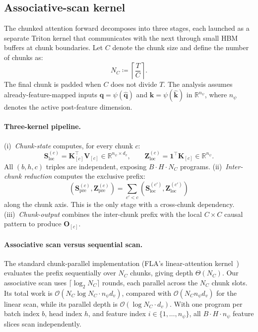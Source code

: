 \documentclass{article}
\newcommand{\1}{\bm{1}}
\newcommand{\defeq}{\coloneqq}
\def\vk{{\bm{k}}}
\def\vq{{\bm{q}}}
\def\mK{{\bm{K}}}
\def\mO{{\bm{O}}}
\def\mS{{\bm{S}}}
\def\mV{{\bm{V}}}
\def\mZ{{\bm{Z}}}
\def\gO{{\mathcal{O}}}
\newcommand{\R}{\mathbb{R}}
\newcommand{\seql}{T}
\theoremstyle{definition}
\begin{document}
\subsection{Associative-scan kernel}
\label{app:tree-scan}

The chunked attention forward decomposes into three stages, each launched as a separate Triton
kernel that communicates with the next through small HBM buffers at chunk boundaries. Let $C$
denote the chunk size and define the number of chunks as:
\[
  N_C\defeq\left\lceil\frac{\seql}{C}\right\rceil.
\]
The final chunk is padded when $C$ does not divide $\seql$. The analysis assumes already-feature-mapped
inputs $\vq=\psi(\hat{\vq})$ and $\vk=\psi(\hat{\vk})$ in $\R^{n_\psi}$, where $n_\psi$ denotes
the active post-feature dimension.

\paragraph{Three-kernel pipeline.} (i)~\emph{Chunk-state} computes, for every chunk $c$:
\[
  \mS^{(c)}_\text{loc}
    =\mK_{[c]}^{\!\top}\mV_{[c]}
    \in\R^{n_\psi\times d_v},
  \qquad
  \mZ^{(c)}_\text{loc}
    =\mathbf{1}^{\!\top}\mK_{[c]}
    \in\R^{n_\psi}.
\]
All $(b,h,c)$ triples are independent, exposing $B\!\cdot\!H\!\cdot\!N_C$ programs.
(ii)~\emph{Inter-chunk reduction} computes the exclusive prefix:
\[
  (\mS^{(c)}_\text{pre},\mZ^{(c)}_\text{pre})
  =\sum_{c'<c}(\mS^{(c')}_\text{loc},\mZ^{(c')}_\text{loc})
\]
along the chunk axis. This is the only stage with a cross-chunk dependency.
(iii)~\emph{Chunk-output} combines the inter-chunk prefix with the local
$C\!\times\!C$ causal pattern to produce $\mO_{[c]}$.

\paragraph{Associative scan versus sequential scan.} The standard chunk-parallel implementation
(FLA's linear-attention kernel~\citep{yang24fla}) evaluates the prefix sequentially over $N_C$
chunks, giving depth $\Theta(N_C)$. Our associative scan uses
$\lceil\log_2 N_C\rceil$ rounds, each parallel across the $N_C$ chunk slots. Its total work is
$\gO(N_C\log N_C\cdot n_\psi d_v)$, compared with $\gO(N_C n_\psi d_v)$ for the linear scan, while its parallel
depth is $\gO(\log N_C\cdot d_v)$. With one program per batch index $b$, head index $h$, and
feature index $i\in\{1,\ldots,n_\psi\}$, all $B\!\cdot\!H\!\cdot\!n_\psi$ feature slices scan
independently.
\end{document}
